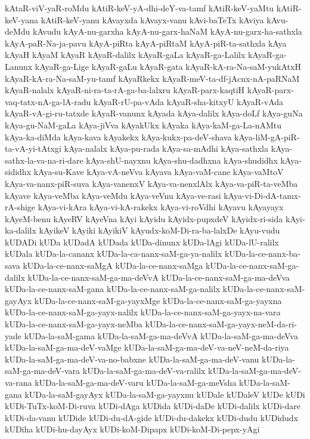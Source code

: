 {kAtaR-viV-yaR-roMdu
kAtiR-keV-yA-dhi-deY-va-tamf
kAtiR-keV-yaMtu
kAtiR-keV-yana
kAtiR-keV-yanu
kAvayxda
kAvayx-vanu
kAvi-baTeTx
kAviya
kAvu-deMdu
kAvudu
kAyA-nu-garxha
kAyA-nu-garx-haNaM
kAyA-nu-garx-ha-sathxla
kAyA-paR-Na-ja-pavu
kAyA-piRta
kAyA-piRtaM
kAyA-piR-ta-sathxla
kAya
kAyaH
kAyaM
kAyaR
kAyaR-dalilx
kAyaR-gaLa
kAyaR-ga-Lalilx
kAyaR-ga-Lanunx
kAyaR-ga-Lige
kAyaR-gaLu
kAyaR-gata
kAyaR-kA-ra-Na-saM-yukAtxH
kAyaR-kA-ra-Na-saM-yu-tamf
kAyaRkekx
kAyaR-meV-ta-df-jAcnx-nA-paRNaM
kAyaR-nalalx
kAyaR-ni-ra-ta-rA-ga-ba-lalxru
kAyaR-parx-kaqtiH
kAyaR-parx-vaq-tatx-nA-ga-lA-radu
kAyaR-rU-pa-vAda
kAyaR-sha-kitxyU
kAyaR-vAda
kAyaR-vA-gi-ru-tatxde
kAyaR-vanunx
kAyada
kAya-dalilx
kAya-doLf
kAya-guNa
kAya-gu-NaM-gaLa
kAya-jiVva
kAyakUkx
kAyaka
kAya-kaM-ga-La-nAMtu
kAya-ka-diMda
kAya-kava
kAyakekx
kAya-kukx-pa-deV-shava
kAya-liM-gA-piR-ta-vA-yi-tAtxgi
kAya-nalalx
kAya-pu-rada
kAya-sa-mAdhi
kAya-sathxla
kAya-sathx-la-va-na-ri-dare
kAya-shU-nayxnu
kAya-shu-dadhxna
kAya-shudidhx
kAya-sididhx
kAya-su-Kave
kAya-vA-neVva
kAyava
kAya-vaM-cane
kAya-vaMtoV
kAya-va-nanx-piR-suva
kAya-vanenxV
kAya-va-nenxlAlx
kAya-va-piR-ta-veMba
kAyave
kAya-veMba
kAya-veMdu
kAya-veVnu
kAya-ve-rasi
kAya-vi-Di-dA-tamx-rA-shige
kAya-vi-kAra
kAya-vi-kA-rakekx
kAya-vi-roVdhi
kAyavu
kAyayayx
kAyeM-benu
kAyeRV
kAyeVna
kAyi
kAyidu
kAyidx-pupxdeV
kAyidx-ri-sida
kAyi-ka-dalilx
kAyikeV
kAyiki
kAyikiV
kAyudx-koM-Di-ra-ba-lalxDe
kAyu-vudu
kUDADi
kUDa
kUDadA
kUDada
kUDa-dinunx
kUDa-lAgi
kUDa-lU-ralilx
kUDala
kUDa-la-cananx
kUDa-la-ca-nanx-saM-ga-ya-nalilx
kUDa-la-ce-nanx-ba-sava
kUDa-la-ce-nanx-saMgA
kUDa-la-ce-nanx-saMga
kUDa-la-ce-nanx-saM-ga-dalilx
kUDa-la-ce-nanx-saM-ga-ma-deVvA
kUDa-la-ce-nanx-saM-ga-ma-deVva
kUDa-la-ce-nanx-saM-gana
kUDa-la-ce-nanx-saM-ga-nalilx
kUDa-la-ce-nanx-saM-gayAyx
kUDa-la-ce-nanx-saM-ga-yayxMge
kUDa-la-ce-nanx-saM-ga-yayxna
kUDa-la-ce-nanx-saM-ga-yayx-nalilx
kUDa-la-ce-nanx-saM-ga-yayx-na-vara
kUDa-la-ce-nanx-saM-ga-yayx-neMba
kUDa-la-ce-nanx-saM-ga-yayx-neM-da-ri-yade
kUDa-la-saM-gama
kUDa-la-saM-ga-ma-deVvA
kUDa-la-saM-ga-ma-deVva
kUDa-la-saM-ga-ma-deV-vaMge
kUDa-la-saM-ga-ma-deV-va-neV-neM-da-riya
kUDa-la-saM-ga-ma-deV-va-no-babxne
kUDa-la-saM-ga-ma-deV-vanu
kUDa-la-saM-ga-ma-deV-vara
kUDa-la-saM-ga-ma-deV-va-ralilx
kUDa-la-saM-ga-ma-deV-va-rana
kUDa-la-saM-ga-ma-deV-varu
kUDa-la-saM-ga-meVsha
kUDa-la-saM-gana
kUDa-la-saM-gayAyx
kUDa-la-saM-ga-yayxnu
kUDale
kUDaleV
kUDe
kUDi
kUDi-TuTx-koM-Di-ruva
kUDi-dAga
kUDida
kUDi-daDe
kUDi-dalilx
kUDi-dare
kUDi-da-vanu
kUDide
kUDi-du-dA-gide
kUDi-du-dakekx
kUDi-dudu
kUDidudx
kUDiha
kUDi-hu-dayAyx
kUDi-koM-Dipapx
kUDi-koM-Di-pepx-yAgi
}
